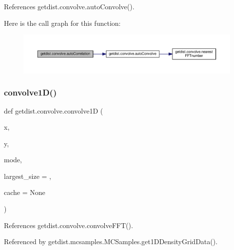 References getdist.\+convolve.\+auto\+Convolve().

Here is the call graph for this function\+:
\nopagebreak
\begin{figure}[H]
\begin{center}
\leavevmode
\includegraphics[width=350pt]{namespacegetdist_1_1convolve_ae675446f66ae37d976900cf3844eb726_cgraph}
\end{center}
\end{figure}
\mbox{\label{namespacegetdist_1_1convolve_afcf448b1f8993227af712ca2b0c8399c}} 
\subsubsection{\texorpdfstring{convolve1\+D()}{convolve1D()}}
{\footnotesize\ttfamily def getdist.\+convolve.\+convolve1D (\begin{DoxyParamCaption}\item[{}]{x,  }\item[{}]{y,  }\item[{}]{mode,  }\item[{}]{largest\+\_\+size = {},  }\item[{}]{cache = {\ttfamily None} }\end{DoxyParamCaption})}



References getdist.\+convolve.\+convolve\+F\+F\+T().



Referenced by getdist.\+mcsamples.\+M\+C\+Samples.\+get1\+D\+Density\+Grid\+Data().

